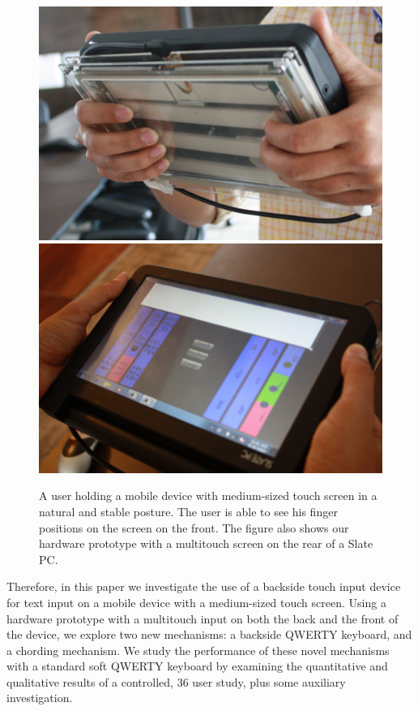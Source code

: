 \begin{figure}
    \includegraphics[scale=0.43]{Figures/natural1.pdf} 
     \includegraphics[scale=0.43]{Figures/natural2.pdf} 
     \caption{A user holding a mobile device with medium-sized touch
       screen in a natural and stable posture. The user is able to see
       his finger positions on the screen on the front. The figure
       also shows our hardware prototype with a multitouch screen on
       the rear of a Slate PC.}
        \label{fig:natural}
\end{figure}

Therefore, in this paper we investigate the use of a backside touch input device
for text input on a mobile device with a medium-sized touch
screen. Using a hardware prototype with a multitouch input on both the
back and the front of the device, we explore two new mechanisms: a
backside QWERTY keyboard, and a chording mechanism.  We study the
performance of these novel mechanisms with a standard soft QWERTY
keyboard by examining the quantitative and qualitative results of a
controlled, 36 user study, plus some auxiliary investigation.
